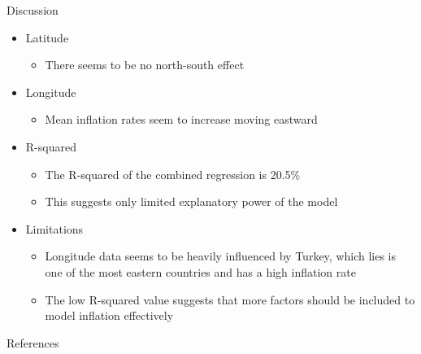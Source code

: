 \documentclass[10pt]{beamer}
\begin{document}
\begin{frame}{Discussion}

  \begin{itemize}
      \item Latitude
      \begin{itemize}
          \item There seems to be no north-south effect
      \end{itemize}
      \item Longitude
      \begin{itemize}
          \item Mean inflation rates seem to increase moving eastward
      \end{itemize}
      \item R-squared
      \begin{itemize}
          \item The R-squared of the combined regression is 20.5\% 
          \item This suggests only limited explanatory power of the model
      \end{itemize}
      
      \end{itemize}
  \vspace{1em}

  \begin{itemize}
      \item Limitations
      \begin{itemize}
          \item Longitude data seems to be heavily influenced by Turkey, which lies is one of the most eastern countries and has a high inflation rate
          \item The low R-squared value suggests that more factors should be included to model inflation effectively
      \end{itemize}
  \end{itemize}

\end{frame}

\begin{frame}[allowframebreaks]{References}
\printbibliography
\end{frame}
\end{document}
